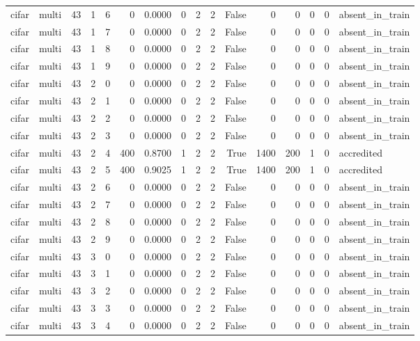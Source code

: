 \begin{tabular}{llrrrrrrrrrrrrrl}
cifar & multi & 43 & 1 & 6 & 0 & 0.0000 & 0 & 2 & 2 & False & 0 & 0 & 0 & 0 & absent\_in\_train \\
cifar & multi & 43 & 1 & 7 & 0 & 0.0000 & 0 & 2 & 2 & False & 0 & 0 & 0 & 0 & absent\_in\_train \\
cifar & multi & 43 & 1 & 8 & 0 & 0.0000 & 0 & 2 & 2 & False & 0 & 0 & 0 & 0 & absent\_in\_train \\
cifar & multi & 43 & 1 & 9 & 0 & 0.0000 & 0 & 2 & 2 & False & 0 & 0 & 0 & 0 & absent\_in\_train \\
cifar & multi & 43 & 2 & 0 & 0 & 0.0000 & 0 & 2 & 2 & False & 0 & 0 & 0 & 0 & absent\_in\_train \\
cifar & multi & 43 & 2 & 1 & 0 & 0.0000 & 0 & 2 & 2 & False & 0 & 0 & 0 & 0 & absent\_in\_train \\
cifar & multi & 43 & 2 & 2 & 0 & 0.0000 & 0 & 2 & 2 & False & 0 & 0 & 0 & 0 & absent\_in\_train \\
cifar & multi & 43 & 2 & 3 & 0 & 0.0000 & 0 & 2 & 2 & False & 0 & 0 & 0 & 0 & absent\_in\_train \\
cifar & multi & 43 & 2 & 4 & 400 & 0.8700 & 1 & 2 & 2 & True & 1400 & 200 & 1 & 0 & accredited \\
cifar & multi & 43 & 2 & 5 & 400 & 0.9025 & 1 & 2 & 2 & True & 1400 & 200 & 1 & 0 & accredited \\
cifar & multi & 43 & 2 & 6 & 0 & 0.0000 & 0 & 2 & 2 & False & 0 & 0 & 0 & 0 & absent\_in\_train \\
cifar & multi & 43 & 2 & 7 & 0 & 0.0000 & 0 & 2 & 2 & False & 0 & 0 & 0 & 0 & absent\_in\_train \\
cifar & multi & 43 & 2 & 8 & 0 & 0.0000 & 0 & 2 & 2 & False & 0 & 0 & 0 & 0 & absent\_in\_train \\
cifar & multi & 43 & 2 & 9 & 0 & 0.0000 & 0 & 2 & 2 & False & 0 & 0 & 0 & 0 & absent\_in\_train \\
cifar & multi & 43 & 3 & 0 & 0 & 0.0000 & 0 & 2 & 2 & False & 0 & 0 & 0 & 0 & absent\_in\_train \\
cifar & multi & 43 & 3 & 1 & 0 & 0.0000 & 0 & 2 & 2 & False & 0 & 0 & 0 & 0 & absent\_in\_train \\
cifar & multi & 43 & 3 & 2 & 0 & 0.0000 & 0 & 2 & 2 & False & 0 & 0 & 0 & 0 & absent\_in\_train \\
cifar & multi & 43 & 3 & 3 & 0 & 0.0000 & 0 & 2 & 2 & False & 0 & 0 & 0 & 0 & absent\_in\_train \\
cifar & multi & 43 & 3 & 4 & 0 & 0.0000 & 0 & 2 & 2 & False & 0 & 0 & 0 & 0 & absent\_in\_train \\

\end{tabular}
